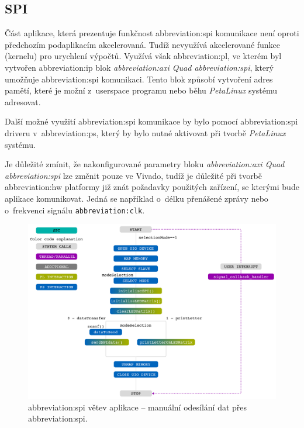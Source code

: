 \documentclass[a4paper, twoside, 11pt]{article}
\newcommand{\fbar}{\FloatBarrier}
\begin{document}
	   \fbar
	   \subsection{SPI}\label{subsec:spi}
	   Část aplikace, která prezentuje funkčnost \gls{abbreviation:spi} komunikace není oproti předchozím podaplikacím akcelerovaná. Tudíž nevyužívá akcelerované funkce (kernelu) pro urychlení výpočtů. Využívá však \gls{abbreviation:pl}, ve kterém byl vytvořen \gls{abbreviation:ip} blok \textit{\gls{abbreviation:axi} Quad \gls{abbreviation:spi}}, který umožňuje \gls{abbreviation:spi} komunikaci. Tento blok způsobí vytvoření adres pamětí, které je možní z~userspace programu nebo běhu \textit{PetaLinux} systému adresovat.\par
	   Další možné využití \gls{abbreviation:spi} komunikace by bylo pomocí \gls{abbreviation:spi} driveru v~\gls{abbreviation:ps}, který by bylo nutné aktivovat při tvorbě \textit{PetaLinux} systému.\par
	   Je důležité zmínit, že nakonfigurované parametry bloku \textit{\gls{abbreviation:axi} Quad \gls{abbreviation:spi}} lze změnit pouze ve Vivado, tudíž je důležité při tvorbě \gls{abbreviation:hw} platformy již znát požadavky použitých zařízení, se kterými bude aplikace komunikovat. Jedná se například o~délku přenášené zprávy nebo o~frekvenci signálu \texttt{\gls{abbreviation:clk}}.\par
	   
	   \begin{figure}[htbp!]
			\centering
			\includegraphics[width=1\textwidth]{src/pdf/spi.pdf}
			\caption{\gls{abbreviation:spi} větev aplikace – manuální odesílání dat přes \gls{abbreviation:spi}.}
			\label{fig:spi}
	\end{figure}
\end{document}
